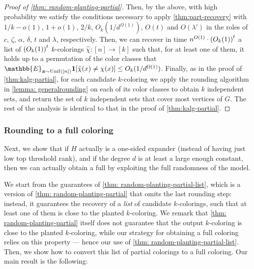 \begin{proof}[Proof of \cref{thm: random-planting-partial}]
    Then, by the above, with high probability we satisfy the conditions necessary to apply \cref{thm:part-recovery} with $1/k-o(1)$, $1+o(1)$, $2/k$, $O_k(1/d^{\Omega(1)})$, $O(t)$ and $O(\lambda')$ in the roles of $c$, $\zeta$, $\alpha$, $\delta$, $t$ and $\lambda$, respectively.
    Then, we can recover in time $n^{O(1)} \cdot \left(O_{k}(1)\right)^{t}$ a list of $\left(O_{k}(1)\right)^{t}$ $k$-colorings $\hat{\chi}: [n] \to [k]$ such that, for at least one of them, it holds up to a permutation of the color classes that $\mathbb{E}_{\bm{x} \sim \operatorname{Unif}([n])} \1[\hat\chi(x) \neq \chi(x)] \leq O_k(1/d^{\Omega(1)})$.
    Finally, as in the proof of \cref{thm:kalg-partial}, for each candidate $k$-coloring we apply the rounding algorithm in \cref{lemma: generalrounding} on each of its color classes to obtain $k$ independent sets, and return the set of $k$ independent sets that cover most vertices of $G$.
    The rest of the analysis is identical to that in the proof of \cref{thm:kalg-partial}.
\end{proof}

\subsubsection{Rounding to a full coloring}
\label{sec:full-col}

Next, we show that if $H$ actually is a one-sided expander (instead of having just low top threshold rank), and if the degree $d$ is at least a large enough constant, then we can actually obtain a full \kcl by exploiting the full randomness of the model.

We start from the guarantees of \cref{thm: random-planting-partial-list}, which is a version of \cref{thm: random-planting-partial} that omits the last rounding step: instead, it guarantees the recovery of a \emph{list} of candidate $k$-colorings, such that at least one of them is close to the planted $k$-coloring.
We remark that \cref{thm: random-planting-partial} itself does not guarantee that the output $k$-coloring is close to the planted $k$-coloring, while our strategy for obtaining a full coloring relies on this property --- hence our use of \cref{thm: random-planting-partial-list}.
Then, we show how to convert this list of partial colorings to a full coloring.
Our main result is the following:

